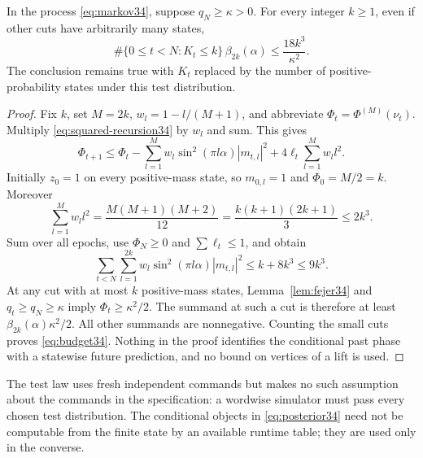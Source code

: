 \begin{theorem}\label{thm:fourier34}
In the process \eqref{eq:markov34}, suppose $q_N\ge\kappa>0$.
For every integer $k\ge1$, even if other cuts have arbitrarily many states,
\begin{equation}\label{eq:budget34}
 \#\{0\le t<N:K_t\le k\}\,\beta_{2k}(\alpha)
                       \le\frac{18k^3}{\kappa^2}.
\end{equation}
The conclusion remains true with $K_t$ replaced by the number of
positive-probability states under this test distribution.
\end{theorem}
\begin{proof}
Fix $k$, set $M=2k$, $w_l=1-l/(M+1)$, and abbreviate
$\Phi_t=\Phi^{(M)}(\nu_t)$. Multiply
\eqref{eq:squared-recursion34} by $w_l$ and sum. This gives
\[
 \Phi_{t+1}\le\Phi_t
   -\sum_{l=1}^M w_l\sin^2(\pi l\alpha)|m_{t,l}|^2
   +4\ell_t\sum_{l=1}^M w_l l^2.
\]
Initially $z_0=1$ on every positive-mass state, so $m_{0,l}=1$ and
$\Phi_0=M/2=k$. Moreover
\[
 \sum_{l=1}^M w_l l^2=\frac{M(M+1)(M+2)}{12}
     =\frac{k(k+1)(2k+1)}3\le2k^3.
\]
Sum over all epochs, use $\Phi_N\ge0$ and
$\sum\ell_t\le1$, and obtain
\begin{equation}\label{eq:finite-potential34}
 \sum_{t<N}\sum_{l=1}^{2k}w_l\sin^2(\pi l\alpha)|m_{t,l}|^2
                                              \le k+8k^3\le9k^3.
\end{equation}
At any cut with at most $k$ positive-mass states,
Lemma~\ref{lem:fejer34} and $q_t\ge q_N\ge\kappa$ imply
$\Phi_t\ge\kappa^2/2$. The summand at such a cut is therefore at
least $\beta_{2k}(\alpha)\kappa^2/2$. All other summands are
nonnegative. Counting the small cuts proves \eqref{eq:budget34}.
Nothing in the proof identifies the conditional past phase with a
statewise future prediction, and no bound on vertices of a lift is used.
\end{proof}

The test law uses fresh independent commands but makes no such assumption
about the commands in the specification: a wordwise simulator must pass
every chosen test distribution. The conditional objects in
\eqref{eq:posterior34} need not be computable from the finite state by
an available runtime table; they are used only in the converse.
